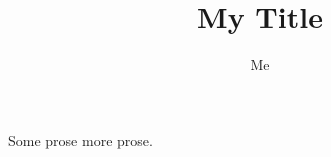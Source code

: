 \usepackage{a} \usepackage{b}
\title{My Title} \author{Me}
Some prose \setlength{\parindent}{0pt} more prose.
